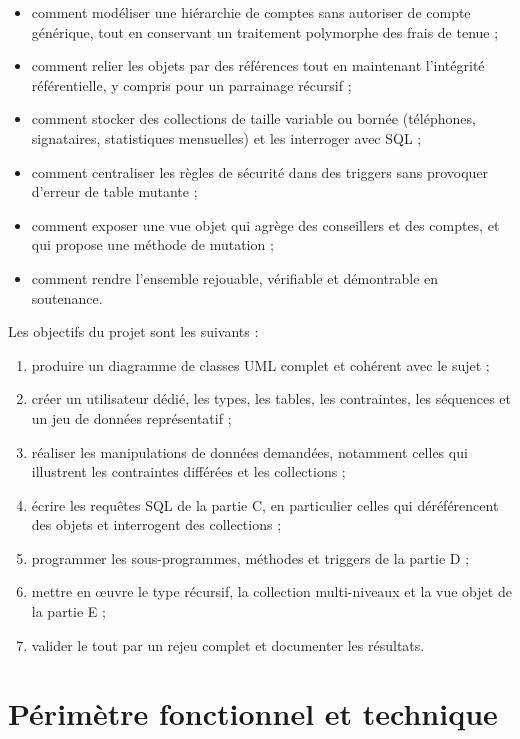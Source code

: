 \begin{itemize}
  \item comment modéliser une hiérarchie de comptes sans autoriser de compte
        générique, tout en conservant un traitement polymorphe des frais de
        tenue ;
  \item comment relier les objets par des références  tout en
        maintenant l'intégrité référentielle, y compris pour un parrainage
        récursif ;
  \item comment stocker des collections de taille variable ou bornée
        (téléphones, signataires, statistiques mensuelles) et les interroger
        avec SQL ;
  \item comment centraliser les règles de sécurité dans des triggers sans
        provoquer d'erreur de table mutante ;
  \item comment exposer une vue objet qui agrège des conseillers et des
        comptes, et qui propose une méthode de mutation ;
  \item comment rendre l'ensemble rejouable, vérifiable et démontrable en
        soutenance.
\end{itemize}

Les objectifs du projet sont les suivants :

\begin{enumerate}
  \item produire un diagramme de classes UML complet et cohérent avec le
        sujet ;
  \item créer un utilisateur dédié, les types, les tables, les contraintes,
        les séquences et un jeu de données représentatif ;
  \item réaliser les manipulations de données demandées, notamment celles
        qui illustrent les contraintes différées et les collections ;
  \item écrire les requêtes SQL de la partie C, en particulier celles qui
        déréférencent des objets et interrogent des collections ;
  \item programmer les sous-programmes, méthodes et triggers de la partie D ;
  \item mettre en œuvre le type récursif, la collection multi-niveaux et la
        vue objet de la partie E ;
  \item valider le tout par un rejeu complet et documenter les résultats.
\end{enumerate}

\section{Périmètre fonctionnel et technique}

